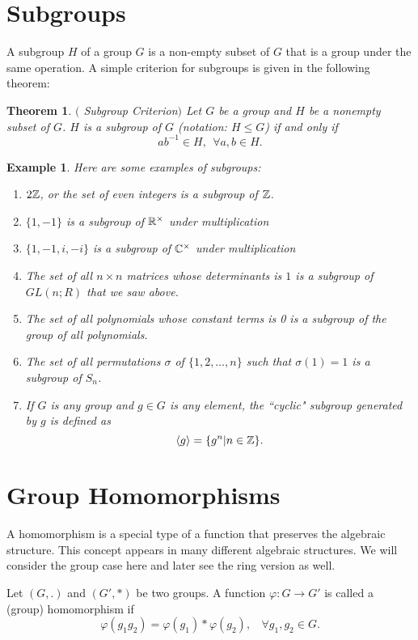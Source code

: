 \documentclass[12pt]{article}
\theoremstyle{plain}
\newtheorem{example}{Example}
\newtheorem{theorem}{Theorem}
\theoremstyle{definition}
\theoremstyle{remark}
\begin{document}
\section{Subgroups}
A subgroup $H$ of a group $G$ is a non-empty subset of $G$ that is a group under the same operation. A simple criterion for subgroups is given in the following theorem:
\begin{theorem}$($ Subgroup Criterion$)$
Let $G$ be a group and $H$ be a nonempty subset of $G$. $H$ is a subgroup of $G$ (notation: $H\leq G$) if and only if 
$$ab^{-1} \in H, \:\: \forall a,b\in H. $$
\end{theorem}
\begin{example}
Here are some examples of subgroups:
\begin{enumerate}
    \item $2\mathbb{Z}$, or the set of even integers is a subgroup of $\mathbb{Z}$.
    \item $\{1,-1\}$ is a subgroup of $\mathbb{R}^{\times}$ under multiplication 
    \item $\{1,-1, i, -i\}$ is a subgroup of $\mathbb{C}^{\times}$ under multiplication 
    \item The set of all $n\times n$ matrices whose determinants is $1$ is a subgroup of $GL(n;R)$ that we saw above. 
    \item The set of all polynomials whose constant terms is 0 is a subgroup of the group of all polynomials.
    \item The set of all permutations $\sigma$ of $\{1,2, \dots, n\}$ such that $\sigma(1)=1$ is a subgroup of $S_n$.
    \item If $G$ is any group and $g\in G$ is any element, the ``cyclic" subgroup generated by $g$ is defined as 
    $$\langle g\rangle = \{g^n|n\in \mathbb{Z}\}.$$
\end{enumerate}
\end{example}
\section{Group Homomorphisms}
A homomorphism is a special type of a function that preserves the algebraic structure. This concept appears in many different algebraic structures. We will consider the group case here and later see the ring version as well. 

Let $(G,.)$ and $(G',*)$ be two groups. A function $\varphi:G\rightarrow G'$ is called a (group) homomorphism if 
$$\varphi(g_1g_2) = \varphi(g_1)*\varphi(g_2), \:\:\:\: \forall g_1, g_2 \in G.$$
\end{document}
